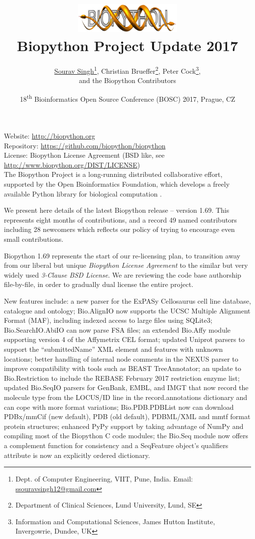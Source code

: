 \documentclass[10pt,oneside]{article}
\title{%
\vspace{-1.5in}
\includegraphics[width=0.4\textwidth]{biopython.jpg}\\
\vspace{3mm}Biopython Project Update 2017}
\author{
	\underline{Sourav Singh}\thanks{Dept. of Computer Engineering, VIIT, Pune, India. Email: \href{mailto:ssouravsingh12@gmail.com}{ssouravsingh12@gmail.com}},
    Christian Brueffer\thanks{Department of Clinical Sciences, Lund University, Lund, SE},
    Peter Cock\thanks{Information and Computational Sciences, James Hutton Institute, Invergowrie, Dundee, UK},\\
    and the Biopython Contributors}
\date{18\textsuperscript{th} Bioinformatics Open Source Conference (BOSC) 2017, Prague, CZ}
\begin{document}
\maketitle
\thispagestyle{empty}

\vspace{-0.2in}
\noindent
Website: \url{http://biopython.org} \\
Repository: \url{https://github.com/biopython/biopython} \\
License: Biopython License Agreement (BSD like, see \url{http://www.biopython.org/DIST/LICENSE}) \\

The Biopython Project is a long-running distributed collaborative effort,
supported by the Open Bioinformatics Foundation, which develops a freely
available Python library for biological computation \cite{AppNote}.

We present here details of the latest Biopython release -- version 1.69.
This represents eight months of contributions, and a record 49 named
contributors including 28 newcomers which reflects our policy of trying to
encourage even small contributions.

Biopython 1.69 represents the start of our re-licensing plan, to transition away
from our liberal but unique \emph{Biopython License Agreement} to the similar
but very widely used \emph{3-Clause BSD License}. We are reviewing the code
base authorship file-by-file, in order to gradually dual license the entire
project.

New features include: a new parser for the ExPASy Cellosaurus cell line
database, catalogue and ontology; Bio.AlignIO now supports the UCSC Multiple
Alignment Format (MAF), including indexed access to large files using SQLite3;
Bio.SearchIO.AbiIO can now parse FSA files; an extended Bio.Affy module supporting
version 4 of the Affymetrix CEL format; updated Uniprot parsers to support
the ``submittedName'' XML element and features with unknown locations; better
handling of internal node comments in the NEXUS parser to improve compatibility
with tools such as BEAST TreeAnnotator; an update to Bio.Restriction to include
the REBASE February 2017 restriction enzyme list; updated Bio.SeqIO parsers for
GenBank, EMBL, and IMGT that now record the molecule type from the LOCUS/ID line
in the record.annotations dictionary and can cope with more format variations;
Bio.PDB.PDBList now can download PDBx/mmCif (new default), PDB (old default),
PDBML/XML and mmtf format protein structures; enhanced PyPy support by taking
advantage of NumPy and compiling most of the Biopython C code modules; the Bio.Seq
module now offers a complement function for consistency and a SeqFeature object's
qualifiers attribute is now an explicitly ordered dictionary.
\end{document}
